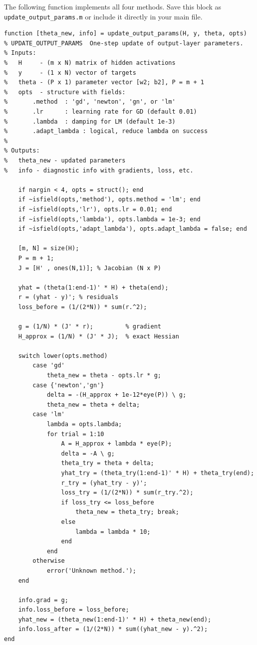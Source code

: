 \documentclass[11pt,a4paper]{article}
\begin{document}
The following function implements all four methods.
Save this block as \texttt{update\_output\_params.m} or include it directly in your main file.

\begin{verbatim}
function [theta_new, info] = update_output_params(H, y, theta, opts)
% UPDATE_OUTPUT_PARAMS  One-step update of output-layer parameters.
% Inputs:
%   H     - (m x N) matrix of hidden activations
%   y     - (1 x N) vector of targets
%   theta - (P x 1) parameter vector [w2; b2], P = m + 1
%   opts  - structure with fields:
%       .method  : 'gd', 'newton', 'gn', or 'lm'
%       .lr      : learning rate for GD (default 0.01)
%       .lambda  : damping for LM (default 1e-3)
%       .adapt_lambda : logical, reduce lambda on success
%
% Outputs:
%   theta_new - updated parameters
%   info - diagnostic info with gradients, loss, etc.

    if nargin < 4, opts = struct(); end
    if ~isfield(opts,'method'), opts.method = 'lm'; end
    if ~isfield(opts,'lr'), opts.lr = 0.01; end
    if ~isfield(opts,'lambda'), opts.lambda = 1e-3; end
    if ~isfield(opts,'adapt_lambda'), opts.adapt_lambda = false; end

    [m, N] = size(H);
    P = m + 1;
    J = [H' , ones(N,1)]; % Jacobian (N x P)

    yhat = (theta(1:end-1)' * H) + theta(end);
    r = (yhat - y)'; % residuals
    loss_before = (1/(2*N)) * sum(r.^2);

    g = (1/N) * (J' * r);         % gradient
    H_approx = (1/N) * (J' * J);  % exact Hessian

    switch lower(opts.method)
        case 'gd'
            theta_new = theta - opts.lr * g;
        case {'newton','gn'}
            delta = -(H_approx + 1e-12*eye(P)) \ g;
            theta_new = theta + delta;
        case 'lm'
            lambda = opts.lambda;
            for trial = 1:10
                A = H_approx + lambda * eye(P);
                delta = -A \ g;
                theta_try = theta + delta;
                yhat_try = (theta_try(1:end-1)' * H) + theta_try(end);
                r_try = (yhat_try - y)';
                loss_try = (1/(2*N)) * sum(r_try.^2);
                if loss_try <= loss_before
                    theta_new = theta_try; break;
                else
                    lambda = lambda * 10;
                end
            end
        otherwise
            error('Unknown method.');
    end

    info.grad = g;
    info.loss_before = loss_before;
    yhat_new = (theta_new(1:end-1)' * H) + theta_new(end);
    info.loss_after = (1/(2*N)) * sum((yhat_new - y).^2);
end
\end{verbatim}
\end{document}
